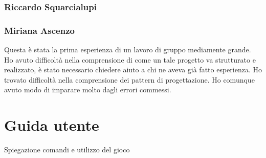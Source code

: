\documentclass[a4paper,12pt]{report}
\begin{document}
    \subsection{Riccardo Squarcialupi}
    \subsection{Miriana Ascenzo}
    Questa è stata la prima esperienza di un lavoro di gruppo mediamente grande.
    Ho avuto difficoltà nella comprensione di come un tale progetto va strutturato e realizzato, è stato necessario chiedere aiuto a chi ne aveva già fatto esperienza.
    Ho trovato difficoltà nella comprensione dei pattern di progettazione.
    Ho comunque avuto modo di imparare molto dagli errori commessi.







	\appendix
	\chapter{Guida utente}

	Spiegazione comandi e utilizzo del gioco
\end{document}
